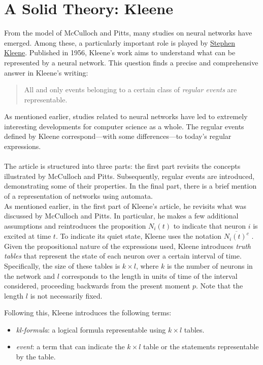 \documentclass[10pt]{article}
\begin{document}
\section{A Solid Theory: Kleene}\label{ch: Kleene}
From the model of McCulloch and Pitts, many studies on neural networks have emerged. Among these, a particularly important role is played by \href{https://en.wikipedia.org/wiki/Stephen_Cole_Kleene}{Stephen Kleene}\cite{Kleene1956}.
Published in 1956, Kleene's work aims to understand what can be represented by a neural network. This question finds a precise and comprehensive answer in Kleene's writing:
\begin{quote}
	All and only events belonging to a certain class of \emph{regular events} are representable.
\end{quote}
As mentioned earlier, studies related to neural networks have led to extremely interesting developments for computer science as a whole. The regular events defined by Kleene correspond—with some differences—to today's regular expressions.\\
\\
The article is structured into three parts: the first part revisits the concepts illustrated by McCulloch and Pitts. Subsequently, regular events are introduced, demonstrating some of their properties. In the final part, there is a brief mention of a representation of networks using automata.
\\
As mentioned earlier, in the first part of Kleene's article, he revisits what was discussed by McCulloch and Pitts. In particular, he makes a few additional assumptions and reintroduces the proposition $N_i(t)$ to indicate that neuron $i$ is excited at time $t$. To indicate its quiet state, Kleene uses the notation $\overline{N_i(t)^c}$ \cite{Kleene1956}. 
Given the propositional nature of the expressions used, Kleene introduces \emph{truth tables} that represent the state of each neuron over a certain interval of time. 
Specifically, the size of these tables is $k \times l$, where $ k $ is the number of neurons in the network and $l$ corresponds to the length in units of time of the interval considered, 
proceeding backwards from the present moment $p$. Note that the length $l$ is not necessarily fixed.

Following this, Kleene introduces the following terms:
\begin{itemize}
	\item \emph{kl-formula}: a logical formula representable using $k \times l $ tables.
	\item \emph{event}: a term that can indicate the $k \times l$ table or the statements representable by the table.
\end{itemize}
\end{document}
